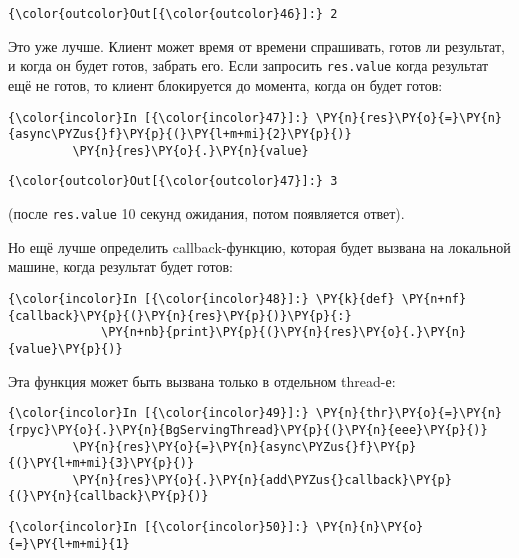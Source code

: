 \begin{Verbatim}[commandchars=\\\{\}]
{\color{outcolor}Out[{\color{outcolor}46}]:} 2
\end{Verbatim}
            
    Это уже лучше. Клиент может время от времени спрашивать, готов ли
результат, и когда он будет готов, забрать его. Если запросить
\texttt{res.value} когда результат ещё не готов, то клиент блокируется
до момента, когда он будет готов:

    \begin{Verbatim}[commandchars=\\\{\}]
{\color{incolor}In [{\color{incolor}47}]:} \PY{n}{res}\PY{o}{=}\PY{n}{async\PYZus{}f}\PY{p}{(}\PY{l+m+mi}{2}\PY{p}{)}
         \PY{n}{res}\PY{o}{.}\PY{n}{value}
\end{Verbatim}


\begin{Verbatim}[commandchars=\\\{\}]
{\color{outcolor}Out[{\color{outcolor}47}]:} 3
\end{Verbatim}
            
    (после \texttt{res.value} 10 секунд ожидания, потом появляется ответ).

Но ещё лучше определить callback-функцию, которая будет вызвана на
локальной машине, когда результат будет готов:

    \begin{Verbatim}[commandchars=\\\{\}]
{\color{incolor}In [{\color{incolor}48}]:} \PY{k}{def} \PY{n+nf}{callback}\PY{p}{(}\PY{n}{res}\PY{p}{)}\PY{p}{:}
             \PY{n+nb}{print}\PY{p}{(}\PY{n}{res}\PY{o}{.}\PY{n}{value}\PY{p}{)}
\end{Verbatim}


    Эта функция может быть вызвана только в отдельном thread-е:

    \begin{Verbatim}[commandchars=\\\{\}]
{\color{incolor}In [{\color{incolor}49}]:} \PY{n}{thr}\PY{o}{=}\PY{n}{rpyc}\PY{o}{.}\PY{n}{BgServingThread}\PY{p}{(}\PY{n}{eee}\PY{p}{)}
         \PY{n}{res}\PY{o}{=}\PY{n}{async\PYZus{}f}\PY{p}{(}\PY{l+m+mi}{3}\PY{p}{)}
         \PY{n}{res}\PY{o}{.}\PY{n}{add\PYZus{}callback}\PY{p}{(}\PY{n}{callback}\PY{p}{)}
\end{Verbatim}


    \begin{Verbatim}[commandchars=\\\{\}]
{\color{incolor}In [{\color{incolor}50}]:} \PY{n}{n}\PY{o}{=}\PY{l+m+mi}{1}
\end{Verbatim}



